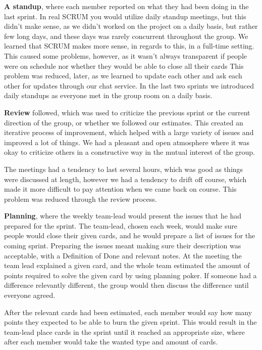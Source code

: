 \textbf{A standup}, where each member reported on what they had been doing in the last sprint.
In real SCRUM you would utilize daily standup meetings, but this didn't make sense, as we didn't worked on the project on a daily basis, but rather few long days, and these days was rarely concurrent throughout the group.
We learned that SCRUM makes more sense, in regards to this, in a full-time setting.
This caused some problems, however, as it wasn't always transparent if people were on schedule nor whether they would be able to close all their cards
This problem was reduced, later, as we learned to update each other and ask each other for updates through our chat service.
In the last two sprints we introduced daily standups as everyone met in the group room on a daily basis.


\textbf{Review} followed, which was used to criticize the previous sprint or the current direction of the group, or whether we followed our estimates.
This created an iterative process of improvement, which helped with a large variety of issues and improved a lot of things.
We had a pleasant and open atmosphere where it was okay to criticize others in a constructive way in the mutual interest of the group.


The meetings had a tendency to last several hours, which was good as things were discussed at length, however we had a tendency to drift off course, which made it more difficult to pay attention when we came back on course.
This problem was reduced through the review process.



\textbf{Planning}, where the weekly team-lead would present the issues that he had prepared for the sprint. 
The team-lead, chosen each week, would make sure people would close their given cards, and he would prepare a list of issues for the coming sprint.
Preparing the issues meant making sure their description was acceptable, with a Definition of Done and relevant notes.
At the meeting the team lead explained a given card, and the whole team estimated the amount of points required to solve the given card by using planning poker.
If someone had a difference relevantly different, the group would then discuss the difference until everyone agreed.


After the relevant cards had been estimated, each member would say how many points they expected to be able to burn the given sprint. 
This would result in the team-lead place cards in the sprint until it reached an appropriate size, where after each member would take the wanted type and amount of cards.



